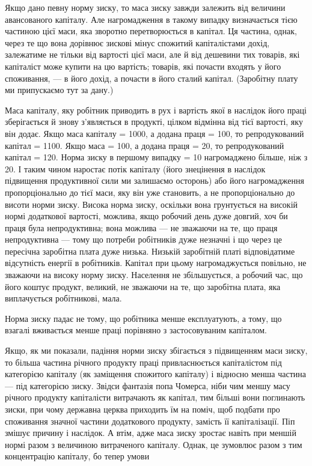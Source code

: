 Якщо дано певну норму зиску, то маса зиску завжди залежить
від величини авансованого капіталу. Але нагромадження
в такому випадку визначається тією частиною цієї маси, яка
зворотно перетворюється в капітал. Ця частина, однак, через
те що вона дорівнює зискові мінус спожитий капіталістами дохід,
залежатиме не тільки від вартості цієї маси, але й від дешевини
тих товарів, які капіталіст може купити на цю вартість;
товарів, які почасти входять у його споживання, — в його дохід,
а почасти в його сталий капітал. (Заробітну плату ми припускаємо
тут за дану.)

Маса капіталу, яку робітник приводить в рух і вартість якої
в наслідок його праці зберігається й знову з’являється в продукті,
цілком відмінна від тієї вартості, яку він додає. Якщо
маса капіталу = 1000, а додана праця = 100, то репродукований
капітал = 1100. Якщо маса = 100, а додана праця = 20, то
репродукований капітал = 120. Норма зиску в першому випадку
= 10%
нагромаджено більше, ніж з 20. І таким чином наростає потік
капіталу (його знецінення в наслідок підвищення продуктивної
сили ми залишаємо осторонь) або його нагромадження
пропорціонально до тієї маси, яку він уже становить, а не
пропорціонально до висоти норми зиску. Висока норма зиску,
оскільки вона грунтується на високій нормі додаткової вартості,
можлива, якщо робочий день дуже довгий, хоч би
праця була непродуктивна; вона можлива — не зважаючи на
те, що праця непродуктивна — тому що потреби робітників
дуже незначні і що через це пересічна заробітна плата дуже
низька. Низькій заробітній платі відповідатиме відсутність енергії
в робітників. Капітал при цьому нагромаджується повільно,
не зважаючи на високу норму зиску. Населення не збільшується,
а робочий час, що його коштує продукт, великий, не зважаючи
на те, що заробітна плата, яка виплачується робітникові,
мала.

Норма зиску падає не тому, що робітника менше експлуатують,
а тому, що взагалі вживається менше праці порівняно
з застосовуваним капіталом.

Якщо, як ми показали, падіння норми зиску збігається з підвищенням
маси зиску, то більша частина річного продукту праці
привласнюється капіталістом під категорією капіталу (як заміщення
спожитого капіталу) і відносно менша частина — під категорією
зиску. Звідси фантазія попа Чомерса, ніби чим меншу масу річного
продукту капіталісти витрачають як капітал, тим більші
вони поглинають зиски, при чому державна церква приходить
їм на поміч, щоб подбати про споживання значної частини додаткового
продукту, замість її капіталізації. Піп змішує причину
і наслідок. А втім, адже маса зиску зростає навіть при меншій
нормі разом з величиною витраченого капіталу. Однак, це зумовлює
разом з тим концентрацію капіталу, бо тепер умови
